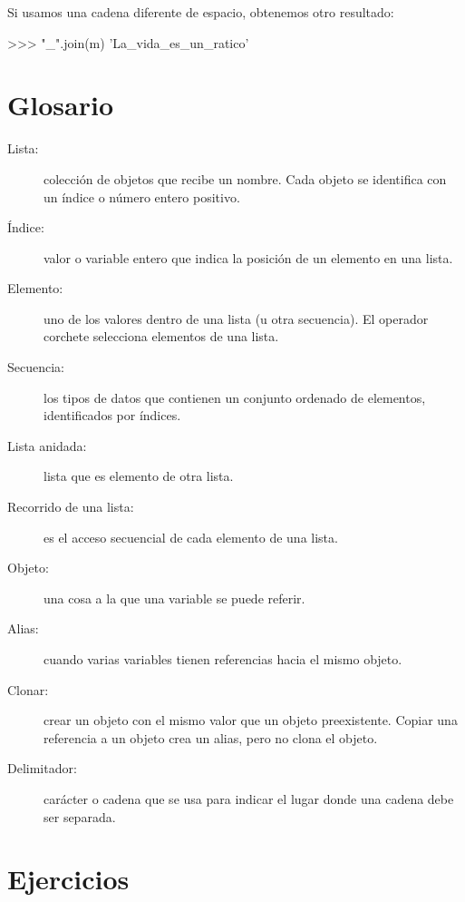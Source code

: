 Si usamos una cadena diferente de espacio, obtenemos otro resultado:
\begin{pyconcode}
>>> "_".join(m)
'La_vida_es_un_ratico'
\end{pyconcode}

\section{Glosario}
\begin{description}
\item [{Lista:}] colección de objetos que recibe un nombre. Cada objeto
se identifica con un índice o número entero positivo.
\item [{Índice:}] valor o variable entero que indica la posición de un
elemento en una lista.
\item [{Elemento:}] uno de los valores dentro de una lista (u otra secuencia).
El operador corchete selecciona elementos de una lista.
\item [{Secuencia:}] los tipos de datos que contienen un conjunto ordenado
de elementos, identificados por índices.
\item [{Lista anidada:}] lista que es elemento de otra lista.
\item [{Recorrido de una lista:}] es el acceso secuencial de cada elemento
de una lista.
\item [{Objeto:}] una cosa a la que una variable se puede referir.
\item [{Alias:}] cuando varias variables tienen referencias hacia el mismo
objeto.
\item [{Clonar:}] crear un objeto con el mismo valor que un objeto preexistente.
Copiar una referencia a un objeto crea un alias, pero no clona el
objeto.
\item [{Delimitador:}] carácter o cadena que se usa para indicar el lugar
donde una cadena debe ser separada.

   
  
  
\end{description}

\section{Ejercicios}

